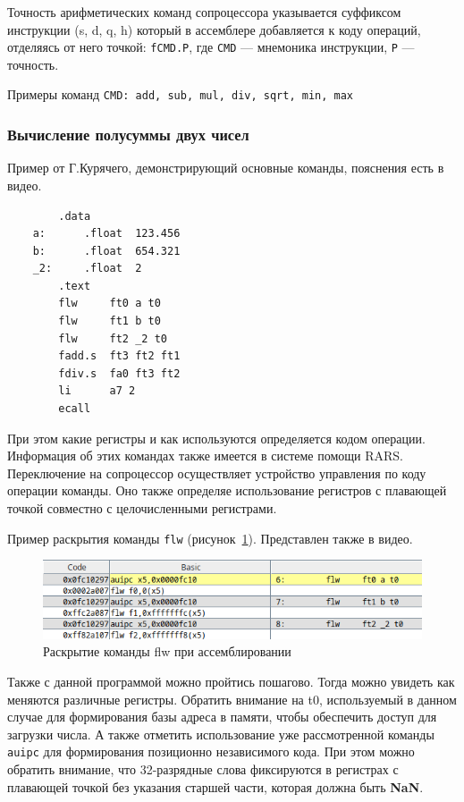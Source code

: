 Точность арифметических команд сопроцессора указывается суффиксом инструкции (s, d, q, h) который в ассемблере добавляется к коду операций, отделяясь от него точкой: \verb|fCMD.P|, где \verb|CMD| — мнемоника инструкции,
\verb|P| — точность.

Примеры команд \verb|CMD: add, sub, mul, div, sqrt, min, max|

\subsubsection{Вычисление полусуммы двух чисел}

Пример от Г.Курячего, демонстрирующий основные команды, пояснения есть в видео.

\begin{verbatim}
        .data
    a:      .float  123.456
    b:      .float  654.321
    _2:     .float  2
        .text
        flw     ft0 a t0
        flw     ft1 b t0
        flw     ft2 _2 t0
        fadd.s  ft3 ft2 ft1
        fdiv.s  fa0 ft3 ft2
        li      a7 2
        ecall
\end{verbatim}
При этом какие регистры и как используются определяется кодом операции. Информация об этих командах также имеется в системе помощи RARS. Переключение на сопроцессор осуществляет устройство управления по коду операции команды. Оно также определяе использование регистров с плавающей точкой совместно с целочисленными регистрами.

Пример раскрытия  команды \verb|flw| (рисунок~\ref{flw-example}). Представлен также в видео.

\begin{figure}[htbp]
    \centering
    \includegraphics[width=1.0\textwidth]{img/flw-example.png}
    \caption{Раскрытие команды flw при ассемблировании}
    \label{flw-example}
\end{figure}
Также с данной программой можно пройтись пошагово. Тогда можно увидеть как меняются различные регистры. Обратить внимание на t0, используемый в данном случае для формирования базы адреса в памяти, чтобы обеспечить доступ для загрузки числа. А также отметить использование уже рассмотренной команды \verb|auipc| для формирования позиционно независимого кода. При этом можно обратить внимание, что 32-разрядные слова фиксируются в регистрах с плавающей точкой без указания старшей части, которая должна быть \textbf{NaN}.

